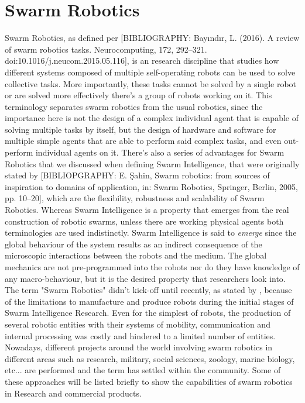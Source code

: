 \section{Swarm Robotics}
Swarm Robotics, as defined per [BIBLIOGRAPHY: Bayındır, L. (2016). A review of swarm robotics tasks. Neurocomputing, 172, 292–321. doi:10.1016/j.neucom.2015.05.116],  is an research discipline that studies how different systems composed of multiple self-operating robots can be used to solve collective tasks. More importantly, these tasks cannot be solved by a single robot or are solved more effectively there's a group of robots working on it. This terminology separates swarm robotics from the usual robotics, since the importance here is not the design of a complex individual agent that is capable of solving multiple tasks by itself, but the design of hardware and software for multiple simple agents that are able to perform said complex tasks, and even out-perform individual agents on it. There's also a series of advantages for Swarm Robotics that we discussed when defining Swarm Intelligence, that were originally stated by [BIBLIOPGRAPHY: E. Şahin, Swarm robotics: from sources of inspiration to domains of application, in: Swarm Robotics, Springer, Berlin, 2005, pp. 10–20], which are the flexibility, robustness and scalability of Swarm Robotics. 
	Whereas Swarm Intelligence is a property that emerges from the real construction of robotic swarms, unless there are working physical agents both terminologies are used indistinctly. Swarm Intelligence is said to \emph{emerge} since the global behaviour of the system results as an indirect consequence of the microscopic interactions between the robots and the medium. The global mechanics are not pre-programmed into the robots nor do they have knowledge of any macro-behaviour, but it is the desired property that researchers look into.
	The term "Swarm Robotics" didn't kick-off until recently, as stated by \citep{C_gerardo_beni}, because of the limitations to manufacture and produce robots during the initial stages of Swarm Intelligence Research. Even for the simplest of robots, the production of several robotic entities with their systems of mobility, communication and internal processing was costly and hindered to a limited number of entities. Nowadays, different projects around the world involving swarm robotics in different areas such as research, military, social sciences, zoology, marine biology, etc...\cite{D_Swarm_Applications} are performed and the term has settled within the community. Some of these approaches will be listed briefly to show the capabilities of swarm robotics in Research and commercial products.
	
